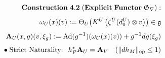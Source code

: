 \documentclass[preview]{standalone}
\begin{document}
\begin{align*}
\special{dvisvgm:raw <g id='unique000'>}\mathbf{Construction\;4.2\;(Explicit\;Functor\;\mathfrak{G}_\nabla):}\\[4pt]\omega_U(x)(v) := \Theta_U\!\left(K^U\left(\zeta^U(d_0^U)\otimes v\right)\right) \in \mathfrak{g}\\[4pt]\mathbf{A}_U(x,g)(v,\xi_g) := \operatorname{Ad}(g^{-1})\!\left(\omega_U(x)(v)\right) + g^{-1}dg(\xi_g)\\[4pt]\bullet\;\text{Strict Naturality: }\; h_P^*\mathbf{A}_U = \mathbf{A}_V \quad (\|dh_M\|_{\text{op}}\le 1)\special{dvisvgm:raw </g>}
\end{align*}
\end{document}
